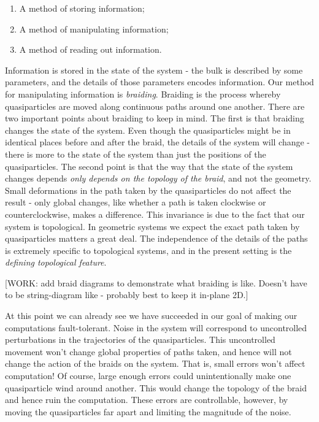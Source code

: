 \begin{enumerate}
\item A method of storing information;
\item A method of manipulating information;
\item A method of reading out information.
\end{enumerate}

Information is stored in the state of the system - the bulk is described by some parameters, and the details of those parameters encodes information. Our method for manipulating information is \textit{braiding}. Braiding is the process whereby quasiparticles are moved along continuous paths around one another. There are two important points about braiding to keep in mind. The first is that braiding changes the state of the system. Even though the quasiparticles might be in identical places before and after the braid, the details of the system will change - there is more to the state of the system than just the positions of the quasiparticles. The second point is that the way that the state of the system changes depends \textit{only depends on the topology of the braid}, and not the geometry. Small deformations in the path taken by the quasiparticles do not affect the result - only global changes, like whether a path is taken clockwise or counterclockwise, makes a difference. This invariance is due to the fact that our system is topological. In geometric systems we expect the exact path taken by quasiparticles matters a great deal. The independence of the details of the paths is extremely specific to topological systems, and in the present setting is the \textit{defining topological feature}.

[WORK: add braid diagrams to demonstrate what braiding is like. Doesn't have to be string-diagram like - probably best to keep it in-plane 2D.]

At this point we can already see we have succeeded in our goal of making our computations fault-tolerant. Noise in the system will correspond to uncontrolled perturbations in the trajectories of the quasiparticles. This uncontrolled movement won’t change global properties of paths taken, and hence will not change the action of the braids on the system. That is, small errors won't affect computation! Of course, large enough errors could unintentionally make one quasiparticle wind around another. This would change the topology of the braid and hence ruin the computation. These errors are controllable, however, by moving the quasiparticles far apart and limiting the magnitude of the noise.

